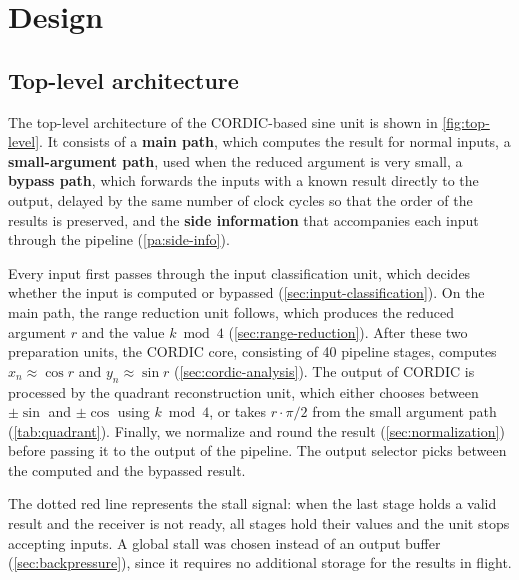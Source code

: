 
\chapter{Design}
\label{ch:design}

\section{Top-level architecture}
\label{sec:top-level}

The top-level architecture of the CORDIC-based sine unit is shown in
\cref{fig:top-level}. It consists of a \textbf{main path}, which computes the result
for normal inputs, a \textbf{small-argument path}, used when the reduced argument is
very small, a \textbf{bypass path}, which forwards the inputs with a known result
directly to the output, delayed by the same number of clock cycles so that the order of the results is preserved, and the
\textbf{side information} that accompanies each input through the pipeline
(\cref{pa:side-info}).

Every input first passes through the input classification unit, which
decides whether the input is computed or bypassed
(\cref{sec:input-classification}). On the main path, the range reduction
unit follows, which produces the reduced argument $r$ and the value
$k \bmod 4$ (\cref{sec:range-reduction}). After these two preparation units,
the CORDIC core, consisting of 40 pipeline stages, computes
$x_{n} \approx \cos r$ and $y_{n} \approx \sin r$
(\cref{sec:cordic-analysis}). The output of CORDIC is processed by the quadrant
reconstruction unit, which either chooses between $\pm \sin$ and $\pm \cos$ using $k \bmod 4$,
or takes $r \cdot \pi/2$ from the small argument path (\cref{tab:quadrant}).
Finally, we normalize and round the result (\cref{sec:normalization}) before passing it to the output of the pipeline.
The output selector picks between the computed and the bypassed result.

The dotted red line represents the stall signal: when the last stage holds a valid result
and the receiver is not ready, all stages hold their values and the unit stops accepting inputs.
A global stall was chosen instead of an output buffer (\cref{sec:backpressure}), since it requires no
additional storage for the results in flight.

